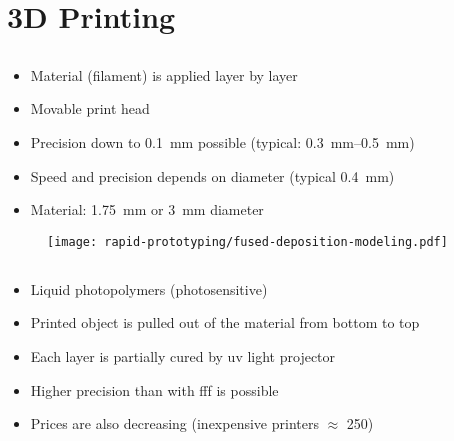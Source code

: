 \documentclass[aspectratio=169]{beamer}
\begin{document}
\section{3D Printing}
\subsection{}
\begin{frame}
    \begin{itemize}
        \item Material (filament) is applied layer by layer
        \item Movable print head
        \item Precision down to \SI{0.1}{\milli\meter} possible (typical: \SIrange{0.3}{0.5}{\milli\meter})
        \item Speed and precision depends on diameter (typical \SI{0.4}{\milli\meter})
        \item Material: \SI{1.75}{\milli\meter} or \SI{3}{\milli\meter} diameter
    \end{itemize}
\end{frame}

\begin{frame}
    \begin{figure}
        \texttt{[image: rapid-prototyping/fused-deposition-modeling.pdf]}
        \caption{}
    \end{figure}
\end{frame}

\subsection{}
\begin{frame}
    \begin{itemize}
        \item Liquid photopolymers (photosensitive)
        \item Printed object is pulled out of the material from bottom to top
        \item Each layer is partially cured by \acs{uv} light projector
        \item Higher precision than with \acs{fff} is possible
        \item Prices are also decreasing (inexpensive printers $\approx$ \SI{250}{\sieuro})
    \end{itemize}
\end{frame}
\end{document}
